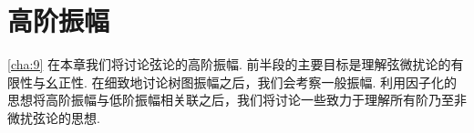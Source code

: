 
\chapter{高阶振幅}  \ref{cha:9}
在本章我们将讨论弦论的高阶振幅. 前半段的主要目标是理解弦微扰论的有限性与幺正性. 在细致地讨论树图振幅之后，我们会考察一般振幅. 利用因子化的思想将高阶振幅与低阶振幅相关联之后，我们将讨论一些致力于理解所有阶乃至非微扰弦论的思想.

